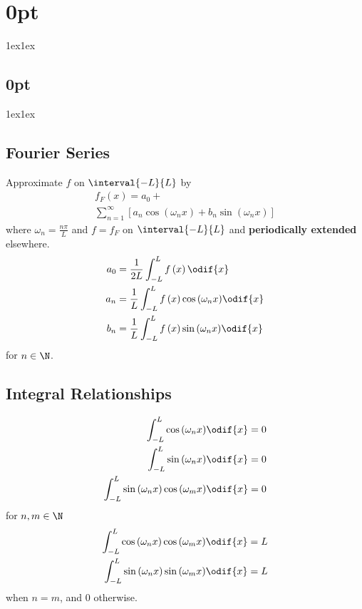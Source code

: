 \documentclass{article}
\begin{document}
\titlespacing*\section{0pt}{1ex}{1ex}
\titlespacing*\subsection{0pt}{1ex}{1ex}
%
\setlength\abovecaptionskip{8pt}
\setlength\belowcaptionskip{-15pt}
\setlength\textfloatsep{0pt}
%
\setlength\abovedisplayskip{1pt}
\setlength\belowdisplayskip{1pt}
\begin{multicols*}{3}
    \section{Fourier Series}
    Approximate \(f\) on \(\interval{-L}{L}\) by
    \begin{multline*}
        f_F\left( x \right) = a_0 + \\
        \sum_{n = 1}^\infty \left[ a_n \cos{\left( \omega_n x \right)} + b_n \sin{\left( \omega_n x \right)} \right]
    \end{multline*}
    where \(\omega_n = \frac{n \pi}{L}\) and
    \(f = f_F\) on \(\interval{-L}{L}\) and \textbf{periodically extended} elsewhere.
    \begin{align*}
        a_0 & = \frac{1}{2L} \int_{-L}^L f\left( x \right) \odif{x}                                \\
        a_n & = \frac{1}{L} \int_{-L}^L f\left( x \right) \cos{\left( \omega_n x \right)} \odif{x} \\
        b_n & = \frac{1}{L} \int_{-L}^L f\left( x \right) \sin{\left( \omega_n x \right)} \odif{x}
    \end{align*}
    for \(n \in \N\).
    \subsection{Integral Relationships}
    \begin{align*}
        \int_{-L}^L \cos{\left( \omega_n x \right)} \odif{x}                                 & = 0 \\
        \int_{-L}^L \sin{\left( \omega_n x \right)} \odif{x}                                 & = 0 \\
        \int_{-L}^L \sin{\left( \omega_n x \right)} \cos{\left( \omega_m x \right)} \odif{x} & = 0
    \end{align*}
    for \(n, m \in \N\)
    \begin{align*}
        \int_{-L}^L \cos{\left( \omega_n x \right)} \cos{\left( \omega_m x \right)} \odif{x} & = L \\
        \int_{-L}^L \sin{\left( \omega_n x \right)} \sin{\left( \omega_m x \right)} \odif{x} & = L
    \end{align*}
    when \(n = m\), and \(0\) otherwise.

\end{multicols*}
\end{document}
